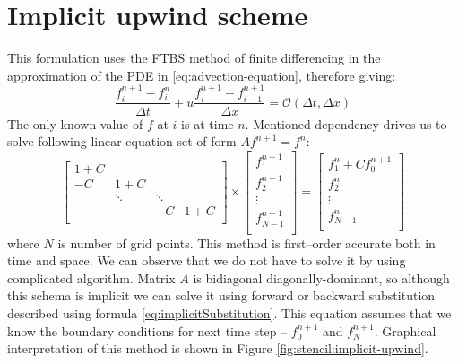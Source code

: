 \section{Implicit upwind scheme} \label{s:general-approach:implicit-upwind-analysis}
	This formulation uses the \gls{FTBS} method of finite differencing in the approximation of the \gls{PDE} in \eqref{eq:advection-equation}, therefore giving:
	\begin{equation} \label{eq:implicitUpwind_first}
		\frac{f_i^{n+1} - f_i^n}{\Delta t} + u\frac{f_i^{n+1} - f_{i-1}^{n+1}}{\Delta x} = \mathcal{O}(\Delta t, \Delta x)
	\end{equation}
	The only known value of $f$ at $i$ is at time $n$. Mentioned dependency drives us to solve following linear equation set of form $Af^{n+1} = f^n$:		
	\begin{equation}
		\begin{bmatrix}
			1+C & & & \\
			-C & 1+C & & \\ 
			& \ddots & \ddots \\
			& & -C & 1+C \\					
		\end{bmatrix} 
		\times
		\begin{bmatrix}
			f_1^{n+1} \\
			f_2^{n+1} \\
			\vdots	\\
			f_{N-1}^{n+1}\\
		\end{bmatrix}
		=
		\begin{bmatrix}
			f_1^{n} + C f_0^{n+1}\\
			f_2^{n} \\
			\vdots	\\
			f_{N-1}^{n}\\
		\end{bmatrix}
	\end{equation} 			
	where $N$ is number of grid points.
	This method is first--order accurate both in time and space. We can observe that we do not have to solve it by using complicated algorithm. Matrix $A$ is bidiagonal diagonally-dominant, so although this schema is implicit we can solve it using forward or backward substitution described using formula \eqref{eq:implicitSubstitution}. This equation assumes that we know the boundary conditions for next time step -- $f_0^{n+1}$ and $f_N^{n+1}$.  Graphical interpretation of this method is shown in Figure \ref{fig:stencil:implicit-upwind}.
